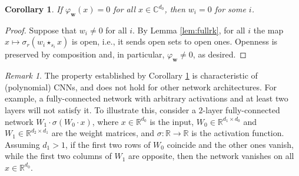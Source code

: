 \documentclass[twoside]{article}
\theoremstyle{plain}%
\newtheorem{cor}[thm]{Corollary}
\theoremstyle{definition}
\theoremstyle{remark}
\newtheorem{rmk}{Remark}[section]
\newcommand{\conv}[1]{\star_{#1}}
\begin{document}
\begin{cor}\label{cor:basepts}
    If $\varphi_\mathbf{w}(x) = 0$ for all $x \in \mathbb{C}^{d_0}$, then $w_i = 0$ for some $i$. 
\end{cor}
\begin{proof}
Suppose that $w_i \not = 0 $ for all $i$. By Lemma \ref{lem:fullrk}, for all $i$ the map $x \mapsto \sigma_r( w_i \conv{s_i} x)$ is open, i.e., it sends open sets to open ones. Openness is preserved by composition and, in particular,
$\varphi_\mathbf{w} \not = 0$, as desired. 
\end{proof}

\begin{rmk}\label{rmk:basepts}
The property established by Corollary \ref{cor:basepts} is characteristic of (polynomial) CNNs, and does not hold for other network architectures. For example, a fully-connected network with arbitrary activations and at least two layers will not satisfy it. To illustrate this, consider a $2$-layer fully-connected network $W_1 \cdot \sigma(W_0 \cdot x)$, where $x \in \mathbb{R}^{d_0}$ is the input, $W_0 \in \mathbb{R}^{d_1 \times d_0}$ and $W_1 \in \mathbb{R}^{d_2 \times d_1}$ are the weight matrices, and $\sigma \colon \mathbb{R} \rightarrow \mathbb{R}$ is the activation function. Assuming $d_1 > 1$, if the first two rows of $W_0$ coincide and the other ones vanish, while the first two columns of $W_1$ are opposite, then the network vanishes on all $x \in \mathbb{R}^{d_0}$. 
\end{rmk}
\end{document}
